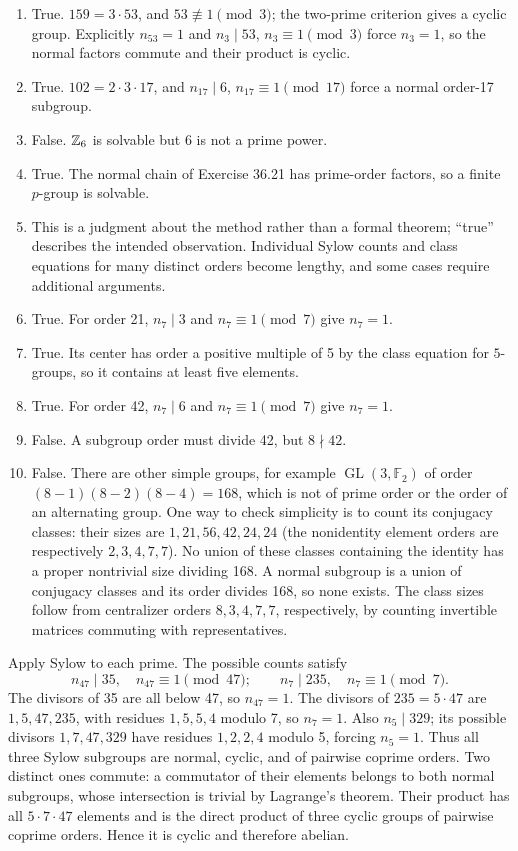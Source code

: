\begin{enumerate}[label=\textbf{(\alph*)}]
\item True. $159=3\cdot53$, and $53\not\equiv1\pmod3$; the two-prime criterion gives a cyclic group. Explicitly $n_{53}=1$ and $n_3\mid53$, $n_3\equiv1\pmod3$ force $n_3=1$, so the normal factors commute and their product is cyclic.
\item True. $102=2\cdot3\cdot17$, and $n_{17}\mid6$, $n_{17}\equiv1\pmod{17}$ force a normal order-17 subgroup.
\item False. $\mathbb{Z}_6$ is solvable but 6 is not a prime power.
\item True. The normal chain of Exercise 36.21 has prime-order factors, so a finite $p$-group is solvable.
\item This is a judgment about the method rather than a formal theorem; ``true'' describes the intended observation. Individual Sylow counts and class equations for many distinct orders become lengthy, and some cases require additional arguments.
\item True. For order 21, $n_7\mid3$ and $n_7\equiv1\pmod7$ give $n_7=1$.
\item True. Its center has order a positive multiple of 5 by the class equation for $5$-groups, so it contains at least five elements.
\item True. For order 42, $n_7\mid6$ and $n_7\equiv1\pmod7$ give $n_7=1$.
\item False. A subgroup order must divide 42, but $8\nmid42$.
\item False. There are other simple groups, for example $\operatorname{GL}(3,\mathbb F_2)$ of order $(8-1)(8-2)(8-4)=168$, which is not of prime order or the order of an alternating group. One way to check simplicity is to count its conjugacy classes: their sizes are $1,21,56,42,24,24$ (the nonidentity element orders are respectively $2,3,4,7,7$). No union of these classes containing the identity has a proper nontrivial size dividing 168. A normal subgroup is a union of conjugacy classes and its order divides 168, so none exists. The class sizes follow from centralizer orders $8,3,4,7,7$, respectively, by counting invertible matrices commuting with representatives.
\end{enumerate}

Apply Sylow to each prime. The possible counts satisfy
\[
n_{47}\mid35,\quad n_{47}\equiv1\pmod{47};\qquad
n_7\mid235,\quad n_7\equiv1\pmod7.
\]
The divisors of 35 are all below 47, so $n_{47}=1$. The divisors of $235=5\cdot47$ are $1,5,47,235$, with residues $1,5,5,4$ modulo 7, so $n_7=1$.
Also $n_5\mid329$; its possible divisors $1,7,47,329$ have residues $1,2,2,4$ modulo 5, forcing $n_5=1$.
Thus all three Sylow subgroups are normal, cyclic, and of pairwise coprime orders. Two distinct ones commute: a commutator of their elements belongs to both normal subgroups, whose intersection is trivial by Lagrange's theorem. Their product has all $5\cdot7\cdot47$ elements and is the direct product of three cyclic groups of pairwise coprime orders. Hence it is cyclic and therefore abelian.

